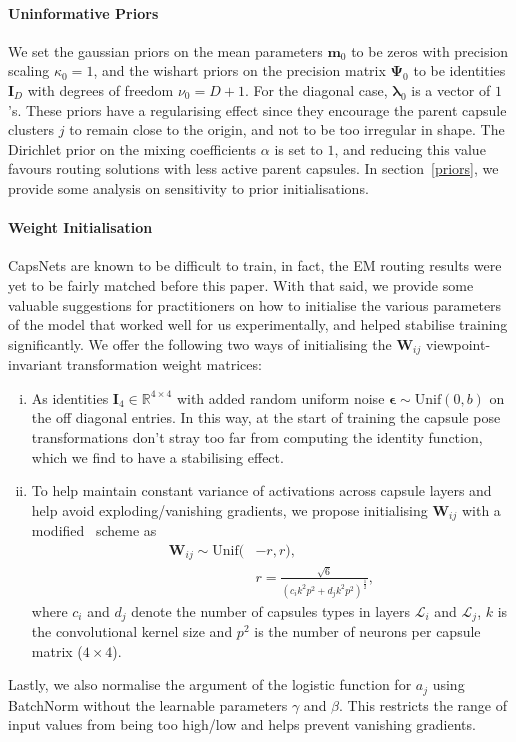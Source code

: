 \documentclass[letterpaper]{article} \usepackage{aaai20}  \usepackage{times}  \usepackage{helvet} \usepackage{courier}  \usepackage[hyphens]{url}  \usepackage{graphicx} \urlstyle{rm} \def\UrlFont{\rm}  \usepackage{graphicx}  \frenchspacing  \setlength{\pdfpagewidth}{8.5in}  \setlength{\pdfpageheight}{11in}  \nocopyright
\begin{document}
\paragraph{Uninformative Priors} We set the gaussian priors on the mean parameters $\mathbf{m}_0$ to be zeros with precision scaling $\kappa_0=1$, and the wishart priors on the precision matrix $\boldsymbol{\Psi}_0$ to be identities $\mathbf{I}_D$ with degrees of freedom $\nu_0=D+1$. For the diagonal case, $\boldsymbol{\lambda}_0$ is a vector of $1$'s. These priors have a regularising effect since they encourage the parent capsule clusters $j$ to remain close to the origin, and not to be too irregular in shape. The Dirichlet prior on the mixing coefficients $\alpha$ is set to $1$, and reducing this value favours routing solutions with less active parent capsules. In section~\ref{priors}, we provide some analysis on sensitivity to prior initialisations.
\paragraph{Weight Initialisation}
CapsNets are known to be difficult to train, in fact, the EM routing results were yet to be fairly matched before this paper. With that said, we provide some valuable suggestions for practitioners on how to initialise the various parameters of the model that worked well for us experimentally, and helped stabilise training significantly. 
We offer the following two ways of initialising the $\mathbf{W}_{ij}$ viewpoint-invariant transformation weight matrices:
\begin{enumerate}[(i)]
  \item As identities $\textbf{I}_4 \in \mathbb{R}^{4 \times 4}$ with added random uniform noise $\boldsymbol{\epsilon} \sim \mathrm{Unif}(0,b)$ on the off diagonal entries. In this way, at the start of training the capsule pose transformations don't stray too far from computing the identity function, which we find to have a stabilising effect.
  \item To help maintain constant variance of activations across capsule layers and help avoid exploding/vanishing gradients, we propose initialising $\mathbf{W}_{ij}$ with a modified~\cite{glorot2010understanding} scheme as
\begin{equation}
\begin{aligned}
    \mathbf{W}_{ij} \sim \mathrm{Unif} \big(&-r, r\big), \\
    &r = \frac{\sqrt{6}}{(c_ik^2p^2 + d_jk^2p^2)^\frac{1}{2}},
\end{aligned}
\end{equation}
where $c_i$ and $d_j$ denote the number of capsules types in layers $\mathcal{L}_i$ and $\mathcal{L}_j$, $k$ is the convolutional kernel size and $p^2$ is the number of neurons per capsule matrix ($4\times4$).
\end{enumerate}
Lastly, we also normalise the argument of the logistic function for $a_j$ using {\selectfont BatchNorm} without the learnable parameters $\gamma$ and $\beta$. This restricts the range of input values from being too high/low and helps prevent vanishing gradients. 
\end{document}
